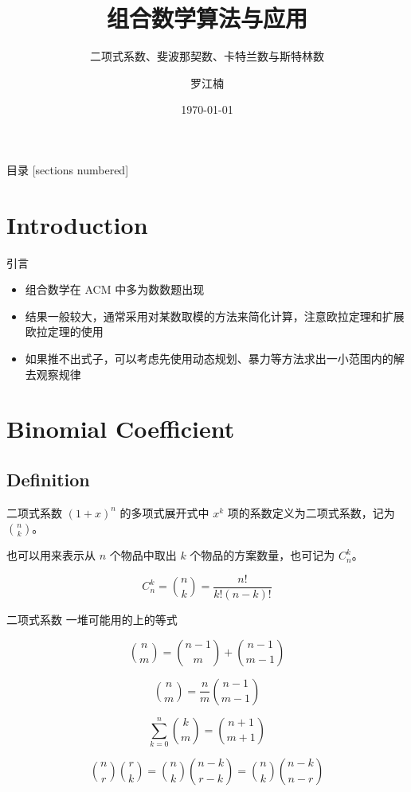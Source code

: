 \documentclass[12pt,aspectratio=169]{beamer}
\title{组合数学算法与应用}
\subtitle{二项式系数、斐波那契数、卡特兰数与斯特林数}
\date{\today}
\author{罗江楠}
\institute{哈尔滨工业大学（威海）}
\begin{document}
\maketitle

\begin{frame}{目录}
  [sections numbered]
  \tableofcontents[hideallsubsections]
\end{frame}

\section[引言]{Introduction}

\begin{frame}[fragile]{引言}
  \begin{itemize}
    \item 组合数学在 ACM 中多为数数题出现
    \item 结果一般较大，通常采用对某数取模的方法来简化计算，注意欧拉定理和扩展欧拉定理的使用
    \item 如果推不出式子，可以考虑先使用动态规划、暴力等方法求出一小范围内的解去观察规律
  \end{itemize}
\end{frame}

\section[二项式系数]{Binomial Coefficient}

\subsection[二项式系数]{Definition}

\begin{frame}[fragile]{二项式系数}
$(1+x)^n$ 的多项式展开式中 $x^k$ 项的系数定义为二项式系数，记为 ${n \choose k}$。

也可以用来表示从 $n$ 个物品中取出 $k$ 个物品的方案数量，也可记为 $C_n^k$。

$$
C_n^k = {n \choose k} = \frac{n!}{k!(n-k)!}
$$
\end{frame}

\begin{frame}[fragile]{二项式系数}
一堆可能用的上的等式

$$
{n \choose m} = {n-1 \choose m} + {n-1 \choose m-1}
$$

$$
{n \choose m} = \frac{n}{m} {n-1 \choose m-1}
$$

$$
\sum_{k=0}^{n} {k \choose m} = {n+1 \choose m+1}
$$

$$
{n \choose r}{r \choose k} = {n \choose k} {n-k \choose r-k} = {n \choose k} {n-k \choose n-r}
$$
\end{frame}
\end{document}
